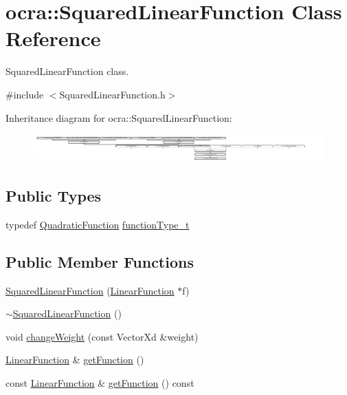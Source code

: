 \hypertarget{classocra_1_1SquaredLinearFunction}{}\section{ocra\+:\+:Squared\+Linear\+Function Class Reference}
\label{classocra_1_1SquaredLinearFunction}


Squared\+Linear\+Function class.  




{\ttfamily \#include $<$Squared\+Linear\+Function.\+h$>$}

Inheritance diagram for ocra\+:\+:Squared\+Linear\+Function\+:\begin{figure}[H]
\begin{center}
\leavevmode
\includegraphics[height=1.082126cm]{df/dfc/classocra_1_1SquaredLinearFunction}
\end{center}
\end{figure}
\subsection*{Public Types}
\begin{DoxyCompactItemize}
\item 
typedef \hyperlink{classocra_1_1QuadraticFunction}{Quadratic\+Function} \hyperlink{classocra_1_1SquaredLinearFunction_a7f1e0d7cfae65a8111bf6615f8c24f19}{function\+Type\+\_\+t}
\end{DoxyCompactItemize}
\subsection*{Public Member Functions}
\begin{DoxyCompactItemize}
\item 
\hyperlink{classocra_1_1SquaredLinearFunction_ae0a8957e1371ef2681494298cd19c040}{Squared\+Linear\+Function} (\hyperlink{classocra_1_1LinearFunction}{Linear\+Function} $\ast$f)
\item 
\hyperlink{classocra_1_1SquaredLinearFunction_adc5c823cc6559151ef1081e8ff62624a}{$\sim$\+Squared\+Linear\+Function} ()
\item 
void \hyperlink{classocra_1_1SquaredLinearFunction_a4c8e5adac8c2d7af02880d4ac5011f83}{change\+Weight} (const Vector\+Xd \&weight)
\item 
\hyperlink{classocra_1_1LinearFunction}{Linear\+Function} \& \hyperlink{classocra_1_1SquaredLinearFunction_aff22d70c8edf05b5b488ffe6ce426e87}{get\+Function} ()
\item 
const \hyperlink{classocra_1_1LinearFunction}{Linear\+Function} \& \hyperlink{classocra_1_1SquaredLinearFunction_a3ab1215a6687d72cc56727ccb35ccb3a}{get\+Function} () const
\end{DoxyCompactItemize}
